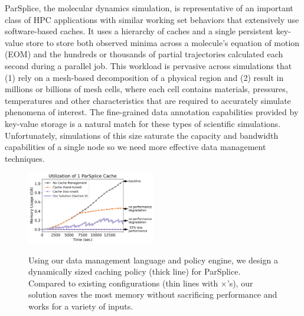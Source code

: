 ParSplice, the molecular dynamics simulation, is representative of an important
class of HPC applications with similar working set behaviors that extensively
use software-based caches. It uses a hierarchy of caches and a single
persistent key-value store to store both observed minima across a molecule's
equation of motion (EOM) and the hundreds or thousands of partial trajectories
calculated each second during a parallel job.  This workload is pervasive
across simulations that (1) rely on a mesh-based decomposition of a physical
region and (2) result in millions or billions of mesh cells, where each cell
contains materials, pressures, temperatures and other characteristics that are
required to accurately simulate phenomena of interest.  The fine-grained data
annotation capabilities provided by key-value storage is a natural match for
these types of scientific simulations.  Unfortunately, simulations of this size
saturate the capacity and bandwidth capabilities of a single node so we need
more effective data management techniques.

\begin{figure}[t]
\noindent\includegraphics[width=0.5\textwidth]{figures/cache-management.png}\\
\caption{Using our data management language and policy engine, we design a
dynamically sized caching policy (thick line) for ParSplice.  Compared to
existing configurations (thin lines with \(\times\)'s), our solution saves the most
memory without sacrificing performance and works for a variety of inputs.
\label{fig:cache-management}}
\end{figure}

